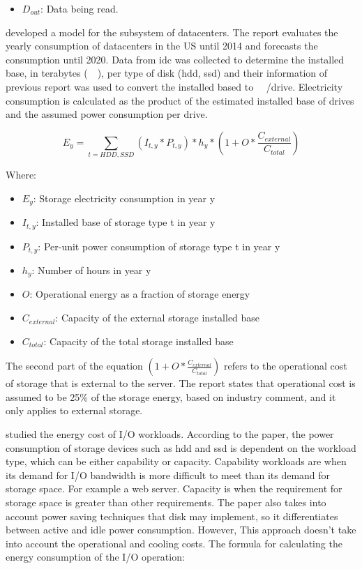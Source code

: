 \begin{itemize}
    \item $D_{out}$: Data being read.
\end{itemize}


\citet{USReport2016} developed a model for the subsystem of datacenters. The report evaluates the yearly consumption of datacenters in the US until 2014 and forecasts the consumption until 2020. Data from \ac{idc} was collected to determine the installed base, in terabytes (\SI{}{\tera\byte}), per type of disk (\ac{hdd}, \ac{ssd}) and their information of previous report \citet{USReport2007} was used to convert the installed based to \SI{}{\tera\byte}/drive.
Electricity consumption is calculated as the product of the estimated installed base of drives and the assumed power consumption per drive.

\begin{equation}
\label{formula:usreport2016}
    E_y = \sum_{t=HDD,SSD}{(I_{t,y} * P_{t,y}) * h_y * (1 + O * \frac{C_{external}}{C_{total}})}
\end{equation}

Where:

\begin{itemize}
    \item $E_y$: Storage electricity consumption in year y
    \item $I_{t,y}$: Installed base of storage type t in year y
    \item $P_{t,y}$: Per-unit power consumption of storage type t in year y
    \item $h_y$: Number of hours in year y
    \item $O$: Operational energy as a fraction of storage energy
    \item $C_{external}$: Capacity of the external storage installed base
    \item $C_{total}$: Capacity of the total storage installed base
\end{itemize}

The second part of the equation $(1 + O * \frac{C_{external}}{C_{total}})$ refers to the operational cost of storage that is external to the server.
The report states that operational cost is assumed to be 25\% of the storage energy, based on industry comment, and it only applies to external storage.


\citet{Li2014} studied the energy cost of I/O workloads. According to the paper, the power consumption of storage devices such as \ac{hdd} and \ac{ssd} is dependent on the workload type, which can be either capability or capacity. Capability workloads are when its demand for I/O bandwidth is more difficult to meet than its demand for storage space. For example a web server. Capacity is when the requirement for storage space is greater than other requirements. The paper also takes into account power saving techniques that disk may implement, so it differentiates between active and idle power consumption. However, This approach doesn't take into account the operational and cooling costs.
The formula for calculating the energy consumption of the I/O operation:

